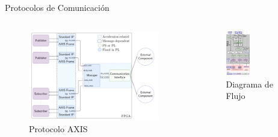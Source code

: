 \documentclass[10pt,aspectratio=169]{beamer}
\begin{document}
\begin{frame}{Protocolos de Comunicación}
  \begin{columns}[onlytextwidth]
    \begin{column}{0.5\textwidth}
      \begin{center}
        \begin{figure}
          \begin{center}
            \includegraphics[width=0.95\textwidth]{figures/axis.png}
          \end{center}
          \caption{Protocolo AXIS}\label{fig:axis}
        \end{figure}
      \end{center}
    \end{column}
    \begin{column}{0.5\textwidth}
      \begin{figure}
        \begin{center}
          \includegraphics[width=0.42\textwidth]{figures/flow-chart.png}
        \end{center}
        \caption{Diagrama de Flujo}\label{fig:flowchart}
      \end{figure}
    \end{column}
  \end{columns}
\end{frame}
\end{document}
